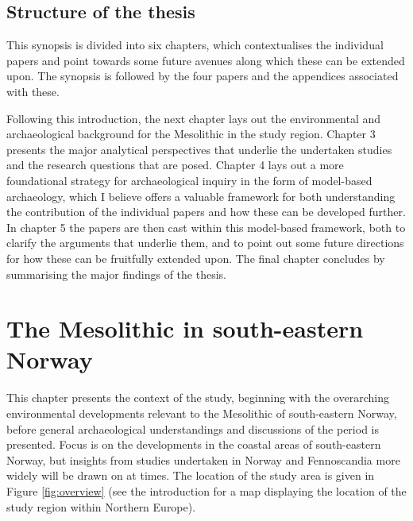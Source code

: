 \documentclass[
  12pt,
  a4paper,
  oneside]{book}
\begin{document}
\hypertarget{structure-of-the-thesis}{%
\section{Structure of the thesis}\label{structure-of-the-thesis}}

This synopsis is divided into six chapters, which contextualises the individual papers and point towards some future avenues along which these can be extended upon. The synopsis is followed by the four papers and the appendices associated with these.

Following this introduction, the next chapter lays out the environmental and archaeological background for the Mesolithic in the study region. Chapter 3 presents the major analytical perspectives that underlie the undertaken studies and the research questions that are posed. Chapter 4 lays out a more foundational strategy for archaeological inquiry in the form of model-based archaeology, which I believe offers a valuable framework for both understanding the contribution of the individual papers and how these can be developed further. In chapter 5 the papers are then cast within this model-based framework, both to clarify the arguments that underlie them, and to point out some future directions for how these can be fruitfully extended upon. The final chapter concludes by summarising the major findings of the thesis.

\hypertarget{chapter2}{%
\chapter{The Mesolithic in south-eastern Norway}\label{chapter2}}

This chapter presents the context of the study, beginning with the overarching environmental developments relevant to the Mesolithic of south-eastern Norway, before general archaeological understandings and discussions of the period is presented. Focus is on the developments in the coastal areas of south-eastern Norway, but insights from studies undertaken in Norway and Fennoscandia more widely will be drawn on at times. The location of the study area is given in Figure \ref{fig:overview} (see the introduction for a map displaying the location of the study region within Northern Europe).
\end{document}
